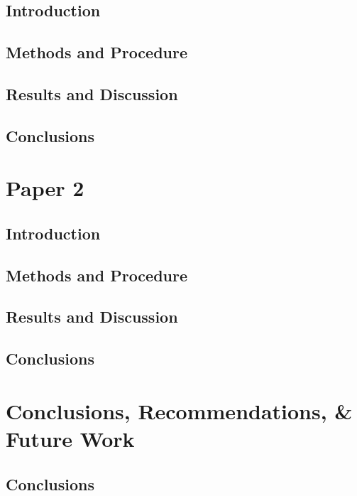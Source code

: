   \section{Introduction}\label{sec:}
    \lipsum[34-36]
  \section{Methods and Procedure}\label{sec:}
    \begin{case}
      \lipsum[10]
    \end{case}
    \begin{case}
      \lipsum[15]
    \end{case}
    \lipsum[46-48]
  \section{Results and Discussion}\label{sec:}
    \lipsum[55-57]
  \section{Conclusions}\label{sec:}
    \lipsum[12-13]
                
\chapter{Paper 2}\label{ch:Paper2}
  \section{Introduction}\label{sec:}
    \lipsum[34-36]
  \section{Methods and Procedure}\label{sec:}
    \lipsum[46-48]
  \section{Results and Discussion}\label{sec:}
    \lipsum[55-57]
  \section{Conclusions}\label{sec:}
    \lipsum[12-13]
                
\chapter{Conclusions, Recommendations, \& Future Work}\label{ch:Conclusions}
  \section{Conclusions}\label{sec:}
    \lipsum[34-36]
